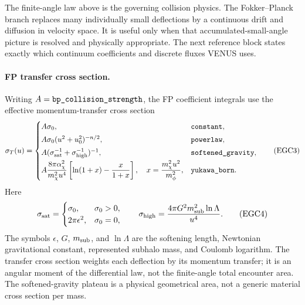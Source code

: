 The finite-angle law above is the governing collision physics.  The
Fokker--Planck branch replaces many individually small deflections by a
continuous drift and diffusion in velocity space.  It is useful only
when that accumulated-small-angle picture is resolved and physically
appropriate.  The next reference block states exactly which continuum
coefficients and discrete fluxes VENUS uses.

\paragraph{FP transfer cross section.}
Writing \(A=\code{bp_collision_strength}\), the FP coefficient integrals use
the effective momentum-transfer cross section
\[
 \sigma_T(u)=
 \begin{cases}
 A\sigma_0,&\code{constant},\\[1mm]
 A\sigma_0(u^2+u_0^2)^{-n/2},&\code{powerlaw},\\[1mm]
 A(\sigma_{\rm sat}^{-1}+\sigma_{\rm high}^{-1})^{-1},
   &\code{softened_gravity},\\[1mm]
 \displaystyle A\frac{8\pi\alpha_\chi^2}{m_\chi^2u^4}
 \left[\ln(1+x)-\frac{x}{1+x}\right],\quad
 x=\frac{m_\chi^2u^2}{m_\phi^2},&\code{yukawa_born}.
 \end{cases}                                             \tag{EGC3}
\]
Here
\[
 \sigma_{\rm sat}=\begin{cases}\sigma_0,&\sigma_0>0,\\
 2\pi\epsilon^2,&\sigma_0=0,\end{cases}\qquad
 \sigma_{\rm high}=\frac{4\pi G^2m_{\rm sub}^2\ln\Lambda}{u^4}. \tag{EGC4}
\]
The symbols \(\epsilon\), \(G\), \(m_{\rm sub}\), and \(\ln\Lambda\)
are the softening length, Newtonian gravitational constant, represented
subhalo mass, and Coulomb logarithm.  The transfer cross section weights each
deflection by its momentum transfer; it is an angular moment of the
differential law, not the finite-angle total encounter area.  The
softened-gravity plateau is a physical geometrical area, not a generic
material cross section per mass.


